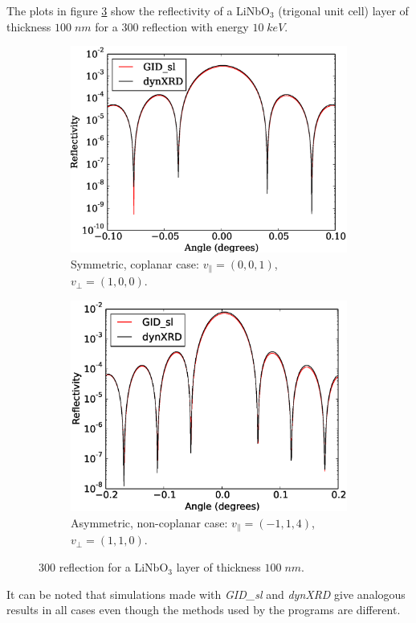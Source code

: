 \documentclass[12pt,oneside,notitlepage,abstracton,a4paper]{scrartcl}
\begin{document}
The plots in figure \ref{testsLiNbO3} show the reflectivity of a LiNbO$ _3$ (trigonal unit cell) layer of thickness $100\;nm$ for a $300$ reflection with energy $10\; keV$.

\begin{figure}[h]
 \centering
 \begin{subfigure}[h]{0.49\textwidth}
  \includegraphics[width=\textwidth]{pics/test9.eps}
  \caption{Symmetric, coplanar case: $v_\parallel=(0, 0, 1)$, $v_\perp=(1,0,0)$.}
  \label{test9}
 \end{subfigure}
 \begin{subfigure}[h]{0.49\textwidth}
  \includegraphics[width=\textwidth]{pics/test11.eps}
  \caption{Asymmetric, non-coplanar case: $v_\parallel=(-1, 1, 4)$,\newline$v_\perp=(1,1,0)$.}
  \label{test11}
 \end{subfigure}
 \caption{$300$ reflection for a LiNbO$ _3$ layer of thickness $100\;nm$.}\label{testsLiNbO3}
\end{figure}
It can be noted that simulations made with \textit{GID\_sl} and \textit{dynXRD} give analogous results in all cases even though the methods used by the programs are different.
\end{document}
